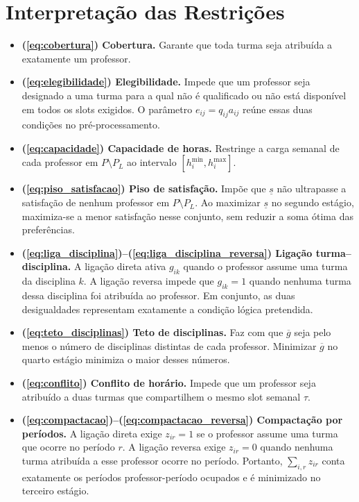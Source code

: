 \documentclass[11pt,a4paper]{article}
\begin{document}
\section{Interpretação das Restrições}
\begin{itemize}
  \item \textbf{(\ref{eq:cobertura}) Cobertura.} Garante que toda turma seja atribuída a exatamente um professor.
  \item \textbf{(\ref{eq:elegibilidade}) Elegibilidade.} Impede que um professor seja designado a uma turma para a qual não é qualificado ou não está disponível em todos os slots exigidos. O parâmetro $e_{ij}=q_{ij}a_{ij}$ reúne essas duas condições no pré-processamento.
  \item \textbf{(\ref{eq:capacidade}) Capacidade de horas.} Restringe a carga semanal de cada professor em $P\setminus P_L$ ao intervalo $[h_i^{\min},h_i^{\max}]$.
  \item \textbf{(\ref{eq:piso_satisfacao}) Piso de satisfação.} Impõe que $\underline{s}$ não ultrapasse a satisfação de nenhum professor em $P\setminus P_L$. Ao maximizar $\underline{s}$ no segundo estágio, maximiza-se a menor satisfação nesse conjunto, sem reduzir a soma ótima das preferências.
  \item \textbf{(\ref{eq:liga_disciplina})--(\ref{eq:liga_disciplina_reversa}) Ligação turma--disciplina.} A ligação direta ativa $g_{ik}$ quando o professor assume uma turma da disciplina $k$. A ligação reversa impede que $g_{ik}=1$ quando nenhuma turma dessa disciplina foi atribuída ao professor. Em conjunto, as duas desigualdades representam exatamente a condição lógica pretendida.
  \item \textbf{(\ref{eq:teto_disciplinas}) Teto de disciplinas.} Faz com que $\overline{g}$ seja pelo menos o número de disciplinas distintas de cada professor. Minimizar $\overline{g}$ no quarto estágio minimiza o maior desses números.
  \item \textbf{(\ref{eq:conflito}) Conflito de horário.} Impede que um professor seja atribuído a duas turmas que compartilhem o mesmo slot semanal $\tau$.
  \item \textbf{(\ref{eq:compactacao})--(\ref{eq:compactacao_reversa}) Compactação por períodos.} A ligação direta exige $z_{ir}=1$ se o professor assume uma turma que ocorre no período $r$. A ligação reversa exige $z_{ir}=0$ quando nenhuma turma atribuída a esse professor ocorre no período. Portanto, $\sum_{i,r}z_{ir}$ conta exatamente os períodos professor-período ocupados e é minimizado no terceiro estágio.
\end{itemize}
\end{document}
